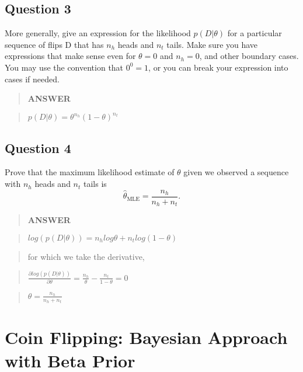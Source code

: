 \documentclass[11pt]{article}
\begin{document}
    \subsection{Question 3}\label{question-3}

More generally, give an expression for the likelihood \(p(D|\theta)\)
for a particular sequence of flips D that has \(n_h\) heads and \(n_t\)
tails. Make sure you have expressions that make sense even for
\(\theta=0\) and \(n_h=0\), and other boundary cases. You may use the
convention that \(0^0 = 1\), or you can break your expression into cases
if needed.

    \begin{quote}
\textbf{ANSWER}
\end{quote}

\begin{quote}
\(p(D|\theta)=\theta^{n_h}(1-\theta)^{n_t}\)
\end{quote}

    \subsection{Question 4}\label{question-4}

Prove that the maximum likelihood estimate of \(\theta\) given we
observed a sequence with \(n_h\) heads and \(n_t\) tails is
\[\hat{\theta}_{\text{MLE}} =\frac{n_h}{n_h+n_t}.\]

    \begin{quote}
\textbf{ANSWER}
\end{quote}

\begin{quote}
\(log(p(D|\theta)) = n_hlog\theta+n_tlog(1-\theta)\)
\end{quote}

\begin{quote}
for which we take the derivative,
\end{quote}

\begin{quote}
\(\frac{\partial log(p(D|\theta))}{\partial \theta}=\frac{n_h}{\theta}-\frac{n_t}{1-\theta}=0\)
\end{quote}

\begin{quote}
\(\theta = \frac{n_h}{n_h+n_t}\)
\end{quote}

\clearpage

    \section{Coin Flipping: Bayesian Approach with Beta
Prior}\label{coin-flipping-bayesian-approach-with-beta-prior}
\end{document}
